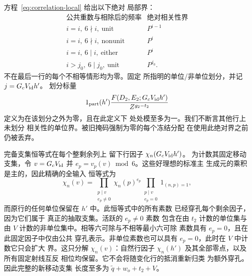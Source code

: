 方程~\eqref{eq:correlation-local} 给出以下绝对
局部界：
\[
 \begin{array}{c|c}
 \text{公共重数与相除后的频率}&
       \text{绝对相关性界}\\ \hline
 i=i,\ 6\nmid i,\ \text{unit}&P^{i-1}\\
 i=i,\ 6\nmid i,\ \text{nonunit}&P^i\\
 i=i,\ 6\mid i,\ \text{either}&P^i\\
 i>j_0,\ 6\mid j_0,\ \text{unit}&P^{j_0}.
 \end{array}
\]
不在最后一行的每个不相等情形均为零。固定
所指明的单位/非单位划分，并记 \(j=G_cV_{\rm id}h'\)。
划分标量
\[
 1_{\rm part}(h')
 \frac{F(D_2,E_2;G_cV_{\rm id}h')}{Z^{g_2-t_2}}
\]
定义为在该划分之外为零，且在此定义下
处处模至多为一。我们不断言其他行上未划分
相关性的单位界。被旧掩码强制为零的每个冻结分配
在使用此绝对界之前仍被丢弃。

完备支集恒等式在每个整剩余列上
留下行因子
\(\chi_n(G_cV_{\rm id}h')\)。
为计数其固定移动支集，令 \(v=G_cV_{\rm id}\) 并
\(e_p=v_p(v)\bmod 6\)。这些好理想的标准主
生成元的乘积是主的，因此精确的全输入
恒等式为
\[
 \chi_n(v)=
   \prod_{\substack{p\mid v\\e_p\ne0}}\chi_n(p)^{e_p}
   \prod_{\substack{p\mid v\\e_p=0}}1_{(n,p)=1},
\]
而原行的任何单位保留在 \(h'\) 中。此恒等式中的所有素数
已经穿孔每个剩余因子，因为它们属于
真正的抽取支集。活跃的 \(e_p\ne0\) 素数
包含在由 \(t_2\) 计数的单位集与由 \(V\)
计数的非单位集中。相等六可除与不相等最小六可除
素数具有 \(e_p=0\)，且在此固定因子中仅由公共
穿孔表示。非单位素数也可以具有
\(e_p=0\)，此时在 \(V\) 中计数它只会扩大
界。这只分解 \(\chi_n(v)\)：自然行因子
\(\chi_n(h')\) 及其全部零点，以及所有固定射线互反
相位均保留。它不会将随变化行的抵消重新归类
为额外穿孔。因此完整的新移动支集
长度至多为 \(\widetilde q+w_o+t_2+V\)。

